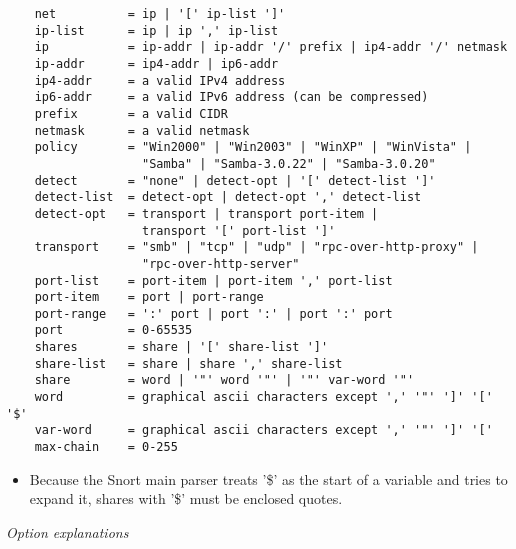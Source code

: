 \documentclass[english]{report}
\begin{document}
\footnotesize
\begin{verbatim}
    net          = ip | '[' ip-list ']'
    ip-list      = ip | ip ',' ip-list
    ip           = ip-addr | ip-addr '/' prefix | ip4-addr '/' netmask
    ip-addr      = ip4-addr | ip6-addr
    ip4-addr     = a valid IPv4 address
    ip6-addr     = a valid IPv6 address (can be compressed)
    prefix       = a valid CIDR
    netmask      = a valid netmask
    policy       = "Win2000" | "Win2003" | "WinXP" | "WinVista" |
                   "Samba" | "Samba-3.0.22" | "Samba-3.0.20"
    detect       = "none" | detect-opt | '[' detect-list ']'
    detect-list  = detect-opt | detect-opt ',' detect-list
    detect-opt   = transport | transport port-item | 
                   transport '[' port-list ']'
    transport    = "smb" | "tcp" | "udp" | "rpc-over-http-proxy" | 
                   "rpc-over-http-server"
    port-list    = port-item | port-item ',' port-list
    port-item    = port | port-range
    port-range   = ':' port | port ':' | port ':' port
    port         = 0-65535
    shares       = share | '[' share-list ']'
    share-list   = share | share ',' share-list
    share        = word | '"' word '"' | '"' var-word '"'
    word         = graphical ascii characters except ',' '"' ']' '[' '$'
    var-word     = graphical ascii characters except ',' '"' ']' '['
    max-chain    = 0-255
\end{verbatim}
\normalsize

\begin{itemize}

\item[] Because the Snort main parser treats '\$' as the start of a variable
and tries to expand it, shares with '\$' must be enclosed quotes.

\end{itemize}

\textit{Option explanations}
\end{document}
